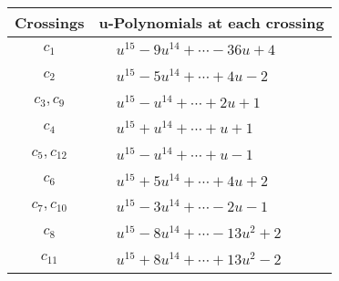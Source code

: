 \documentclass[1p]{elsarticle_modified}
\theoremstyle{definition}
\begin{document}
\begin{tabular}{m{50pt}|m{274pt}}
Crossings & \hspace{64pt}u-Polynomials at each crossing \\
\hline $$\begin{aligned}c_{1}\end{aligned}$$&$\begin{aligned}
&u^{15}-9 u^{14}+\cdots-36 u+4
\end{aligned}$\\
\hline $$\begin{aligned}c_{2}\end{aligned}$$&$\begin{aligned}
&u^{15}-5 u^{14}+\cdots+4 u-2
\end{aligned}$\\
\hline $$\begin{aligned}c_{3},c_{9}\end{aligned}$$&$\begin{aligned}
&u^{15}- u^{14}+\cdots+2 u+1
\end{aligned}$\\
\hline $$\begin{aligned}c_{4}\end{aligned}$$&$\begin{aligned}
&u^{15}+u^{14}+\cdots+u+1
\end{aligned}$\\
\hline $$\begin{aligned}c_{5},c_{12}\end{aligned}$$&$\begin{aligned}
&u^{15}- u^{14}+\cdots+u-1
\end{aligned}$\\
\hline $$\begin{aligned}c_{6}\end{aligned}$$&$\begin{aligned}
&u^{15}+5 u^{14}+\cdots+4 u+2
\end{aligned}$\\
\hline $$\begin{aligned}c_{7},c_{10}\end{aligned}$$&$\begin{aligned}
&u^{15}-3 u^{14}+\cdots-2 u-1
\end{aligned}$\\
\hline $$\begin{aligned}c_{8}\end{aligned}$$&$\begin{aligned}
&u^{15}-8 u^{14}+\cdots-13 u^2+2
\end{aligned}$\\
\hline $$\begin{aligned}c_{11}\end{aligned}$$&$\begin{aligned}
&u^{15}+8 u^{14}+\cdots+13 u^2-2
\end{aligned}$\\
\hline
\end{tabular}\\~\\
\end{document}
